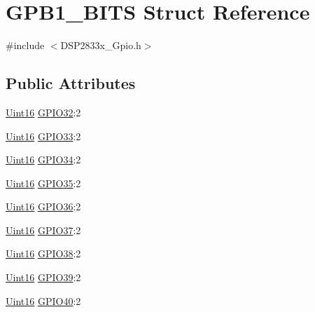 \hypertarget{struct_g_p_b1___b_i_t_s}{}\section{G\+P\+B1\+\_\+\+B\+I\+T\+S Struct Reference}
\label{struct_g_p_b1___b_i_t_s}


{\ttfamily \#include $<$D\+S\+P2833x\+\_\+\+Gpio.\+h$>$}

\subsection*{Public Attributes}
\begin{DoxyCompactItemize}
\item 
\hyperlink{_d_s_p2833x___device_8h_a59a9f6be4562c327cbfb4f7e8e18f08b}{Uint16} \hyperlink{struct_g_p_b1___b_i_t_s_a0be945b42bc0eae583a0be722112affa}{G\+P\+I\+O32}\+:2
\item 
\hyperlink{_d_s_p2833x___device_8h_a59a9f6be4562c327cbfb4f7e8e18f08b}{Uint16} \hyperlink{struct_g_p_b1___b_i_t_s_a58a9e510ee748bd3e012e27e034fcc88}{G\+P\+I\+O33}\+:2
\item 
\hyperlink{_d_s_p2833x___device_8h_a59a9f6be4562c327cbfb4f7e8e18f08b}{Uint16} \hyperlink{struct_g_p_b1___b_i_t_s_ab44083ee25a421e9e1de8ae8ce4d8069}{G\+P\+I\+O34}\+:2
\item 
\hyperlink{_d_s_p2833x___device_8h_a59a9f6be4562c327cbfb4f7e8e18f08b}{Uint16} \hyperlink{struct_g_p_b1___b_i_t_s_a71bf7c6b0d085b6ed3373d17d1c1f97f}{G\+P\+I\+O35}\+:2
\item 
\hyperlink{_d_s_p2833x___device_8h_a59a9f6be4562c327cbfb4f7e8e18f08b}{Uint16} \hyperlink{struct_g_p_b1___b_i_t_s_a2012fae7ab8a4a05f3362fbb9bbd4dfa}{G\+P\+I\+O36}\+:2
\item 
\hyperlink{_d_s_p2833x___device_8h_a59a9f6be4562c327cbfb4f7e8e18f08b}{Uint16} \hyperlink{struct_g_p_b1___b_i_t_s_a0f034a8a55b24283754847bcc1e12fd3}{G\+P\+I\+O37}\+:2
\item 
\hyperlink{_d_s_p2833x___device_8h_a59a9f6be4562c327cbfb4f7e8e18f08b}{Uint16} \hyperlink{struct_g_p_b1___b_i_t_s_a7ad27d48f2f6804acc443994f7df5065}{G\+P\+I\+O38}\+:2
\item 
\hyperlink{_d_s_p2833x___device_8h_a59a9f6be4562c327cbfb4f7e8e18f08b}{Uint16} \hyperlink{struct_g_p_b1___b_i_t_s_acfe2518ad26a404eaaa1a196217f358a}{G\+P\+I\+O39}\+:2
\item 
\hyperlink{_d_s_p2833x___device_8h_a59a9f6be4562c327cbfb4f7e8e18f08b}{Uint16} \hyperlink{struct_g_p_b1___b_i_t_s_a1d35eb957b09c7cfd2514e57e57840e3}{G\+P\+I\+O40}\+:2

\end{DoxyCompactItemize}
